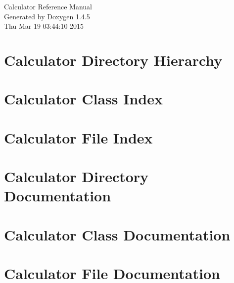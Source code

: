 \documentclass[a4paper]{book}
\begin{document}
\begin{titlepage}
\vspace*{7cm}
\begin{center}
{\Large Calculator Reference Manual}\\
\vspace*{1cm}
{\large Generated by Doxygen 1.4.5}\\
\vspace*{0.5cm}
{\small Thu Mar 19 03:44:10 2015}\\
\end{center}
\end{titlepage}
\clearemptydoublepage
{}
\tableofcontents
\clearemptydoublepage
{}
\chapter{Calculator Directory Hierarchy}

\chapter{Calculator Class Index}

\chapter{Calculator File Index}

\chapter{Calculator Directory Documentation}





\chapter{Calculator Class Documentation}





\chapter{Calculator File Documentation}









\printindex
\end{document}
